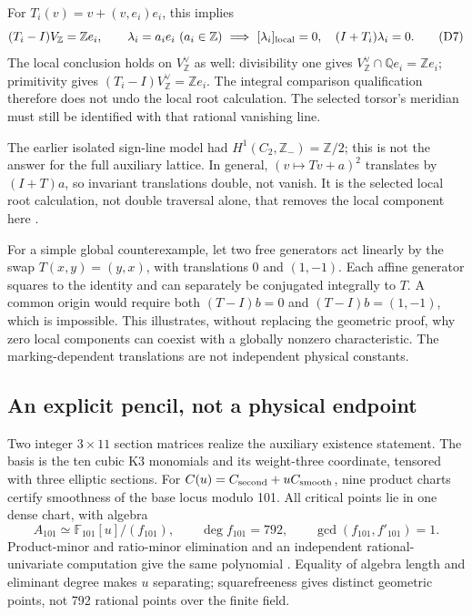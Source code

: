 \documentclass[11pt,a4paper]{article}
\begin{document}
For \(T_i(v)=v+(v,e_i)e_i\), this implies
\[
 (T_i-I)V_{\mathbb Z}=\mathbb Z e_i,\qquad
 \lambda_i=a_i e_i\ (a_i\in\mathbb Z)
 \ \Longrightarrow\
 [\lambda_i]_{\rm local}=0,\quad(I+T_i)\lambda_i=0 .
 \tag{D7}\label{eq:deligne-local}
\]
The local conclusion holds on \(V_{\mathbb Z}^{\vee}\) as well:
divisibility one gives
\(V_{\mathbb Z}^{\vee}\cap\mathbb Qe_i=\mathbb Ze_i\);
primitivity gives \((T_i-I)V_{\mathbb Z}^{\vee}=\mathbb Ze_i\).
The integral comparison qualification therefore does not undo the
local root calculation. The selected torsor's meridian must still
be identified with that rational vanishing line.

The earlier isolated sign-line model had
\(H^1(C_2,\mathbb Z_-)=\mathbb Z/2\); this is not the answer
for the full auxiliary lattice. In general,
\((v\mapsto Tv+a)^2\) translates by \((I+T)a\), so invariant
translations double, not vanish. It is the selected local root
calculation, not double traversal alone, that removes the local
component here \cite{PreprojectionDeligneCutset2026}.

For a simple global counterexample, let two free generators act
linearly by the swap \(T(x,y)=(y,x)\), with translations \(0\)
and \((1,-1)\). Each affine generator squares to the identity
and can separately be conjugated integrally to \(T\). A common
origin would require both \((T-I)b=0\) and
\((T-I)b=(1,-1)\), which is impossible. This illustrates,
without replacing the geometric proof, why zero local components
can coexist with a globally nonzero characteristic. The
marking-dependent translations are not independent physical constants.

\subsection{An explicit pencil, not a physical endpoint}
\label{sec:deligne-explicit-pencil}
Two integer \(3\times11\) section matrices realize the auxiliary
existence statement. The basis is the ten cubic K3 monomials and
its weight-three coordinate, tensored with three elliptic sections.
For \(C(u)=C_{\rm second}+uC_{\rm smooth}\), nine product charts
certify smoothness of the base locus modulo 101. All critical
points lie in one dense chart, with algebra
\[
 A_{101}\simeq\mathbb F_{101}[u]/(f_{101}),\qquad
 \deg f_{101}=792,\qquad \gcd(f_{101},f'_{101})=1 .
 \tag{D8}\label{eq:deligne-pencil}
\]
Product-minor and ratio-minor elimination and an independent
rational-univariate computation give the same polynomial
\cite{PreprojectionExplicitPencil2026}.
Equality of algebra length and eliminant degree makes \(u\)
separating; squarefreeness gives distinct geometric points, not
792 rational points over the finite field.
\end{document}
